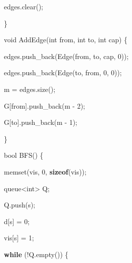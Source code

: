 \documentclass[
]{article}
\newenvironment{Shaded}{}{}
\newcommand{\ControlFlowTok}[1]{\textcolor[rgb]{0.00,0.44,0.13}{\textbf{#1}}}
\newcommand{\DataTypeTok}[1]{\textcolor[rgb]{0.56,0.13,0.00}{#1}}
\newcommand{\DecValTok}[1]{\textcolor[rgb]{0.25,0.63,0.44}{#1}}
\newcommand{\KeywordTok}[1]{\textcolor[rgb]{0.00,0.44,0.13}{\textbf{#1}}}
\newcommand{\NormalTok}[1]{#1}
\newcommand{\OperatorTok}[1]{\textcolor[rgb]{0.40,0.40,0.40}{#1}}
\begin{document}
\begin{Shaded}
\begin{Highlighting}[]
\NormalTok{    edges}\OperatorTok{.}\NormalTok{clear}\OperatorTok{();}

  \OperatorTok{\}}

  \DataTypeTok{void}\NormalTok{ AddEdge}\OperatorTok{(}\DataTypeTok{int}\NormalTok{ from}\OperatorTok{,} \DataTypeTok{int}\NormalTok{ to}\OperatorTok{,} \DataTypeTok{int}\NormalTok{ cap}\OperatorTok{)} \OperatorTok{\{}

\NormalTok{    edges}\OperatorTok{.}\NormalTok{push\_back}\OperatorTok{(}\NormalTok{Edge}\OperatorTok{(}\NormalTok{from}\OperatorTok{,}\NormalTok{ to}\OperatorTok{,}\NormalTok{ cap}\OperatorTok{,} \DecValTok{0}\OperatorTok{));}

\NormalTok{    edges}\OperatorTok{.}\NormalTok{push\_back}\OperatorTok{(}\NormalTok{Edge}\OperatorTok{(}\NormalTok{to}\OperatorTok{,}\NormalTok{ from}\OperatorTok{,} \DecValTok{0}\OperatorTok{,} \DecValTok{0}\OperatorTok{));}

\NormalTok{    m }\OperatorTok{=}\NormalTok{ edges}\OperatorTok{.}\NormalTok{size}\OperatorTok{();}

\NormalTok{    G}\OperatorTok{[}\NormalTok{from}\OperatorTok{].}\NormalTok{push\_back}\OperatorTok{(}\NormalTok{m }\OperatorTok{{-}} \DecValTok{2}\OperatorTok{);}

\NormalTok{    G}\OperatorTok{[}\NormalTok{to}\OperatorTok{].}\NormalTok{push\_back}\OperatorTok{(}\NormalTok{m }\OperatorTok{{-}} \DecValTok{1}\OperatorTok{);}

  \OperatorTok{\}}

  \DataTypeTok{bool}\NormalTok{ BFS}\OperatorTok{()} \OperatorTok{\{}

\NormalTok{    memset}\OperatorTok{(}\NormalTok{vis}\OperatorTok{,} \DecValTok{0}\OperatorTok{,} \KeywordTok{sizeof}\OperatorTok{(}\NormalTok{vis}\OperatorTok{));}

\NormalTok{    queue}\OperatorTok{\textless{}}\DataTypeTok{int}\OperatorTok{\textgreater{}}\NormalTok{ Q}\OperatorTok{;}

\NormalTok{    Q}\OperatorTok{.}\NormalTok{push}\OperatorTok{(}\NormalTok{s}\OperatorTok{);}

\NormalTok{    d}\OperatorTok{[}\NormalTok{s}\OperatorTok{]} \OperatorTok{=} \DecValTok{0}\OperatorTok{;}

\NormalTok{    vis}\OperatorTok{[}\NormalTok{s}\OperatorTok{]} \OperatorTok{=} \DecValTok{1}\OperatorTok{;}

    \ControlFlowTok{while} \OperatorTok{(!}\NormalTok{Q}\OperatorTok{.}\NormalTok{empty}\OperatorTok{())} \OperatorTok{\{}


\end{Highlighting}
\end{Shaded}
\end{document}
